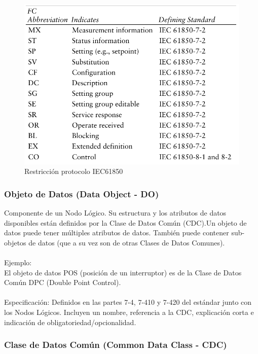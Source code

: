 \documentclass[a5paper]{book}%
\begin{document}
  \begin{figure}[H]
  \centering
  \caption{Restricción protocolo IEC61850}
  \label{fig:iec61850resticcion}
  \includegraphics[width=\linewidth]{restricciones}
\end{figure}



\subsubsection{Objeto de Datos (Data Object - DO)}

Componente de un Nodo Lógico. Su estructura y los atributos de datos disponibles están definidos por la Clase de Datos Común (CDC).Un objeto de datos puede tener múltiples atributos de datos. También puede contener sub-objetos de datos (que a su vez son de otras Clases de Datos Comunes).\\\\
Ejemplo:\\
El objeto de datos POS (posición de un interruptor) es de la Clase de Datos Común DPC (Double Point Control).\\\\
    Especificación: Definidos en las partes 7-4, 7-410 y 7-420 del estándar junto con los Nodos Lógicos. Incluyen un nombre, referencia a la CDC, explicación corta e indicación de obligatoriedad/opcionalidad.

\subsubsection{Clase de Datos Común (Common Data Class - CDC)}
\end{document}
